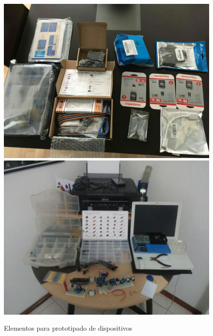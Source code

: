 \begin{figure}[!htb]
\centering
\includegraphics[scale=0.15]{./Figuras/sensores_recibidos.jpg}
\includegraphics[scale=0.2]{./Figuras/sensores.jpg}
\caption{Elementos para prototipado de dispositivos}
\label{fig:sensores_recibidos}
\vspace*{-10pt}
\end{figure}

